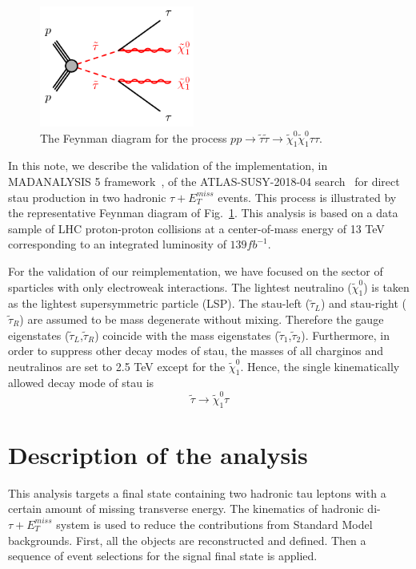 \documentclass{ws-mpla}
\begin{document}
\begin{figure}[t]
  \centerline{\includegraphics[width=2.0in]{fig_01}}
  \vspace*{8pt}
  \caption{The Feynman diagram for the process $pp\rightarrow\tilde{\tau}\tilde{\tau}\rightarrow\tilde{\chi}^0_1\tilde{\chi}^0_1\tau\tau$.\protect\label{fig:fig_01}}
\end{figure}

In this note, we describe the validation of the implementation, in MADANALYSIS 5 framework~\cite{Conte:2018vmg,Dumont:2014tja,Conte:2014zja,Conte:2012fm}, of the ATLAS-SUSY-2018-04 search~\cite{Aad:2019byo} for direct stau production in two hadronic $\tau +E^{miss}_T$ events. 
This process is illustrated by the representative Feynman diagram of Fig.~\ref{fig:fig_01}. 
This analysis is based on a data sample of LHC proton-proton collisions at a center-of-mass energy of 13 TeV corresponding to an integrated luminosity of $139 fb^{-1}$.

For the validation of our reimplementation, we have focused on the sector of sparticles with only electroweak interactions. 
The lightest neutralino ($\tilde{\chi}^0_1$) is taken as the lightest supersymmetric particle (LSP). 
The stau-left ($\tilde{\tau}_L$) and stau-right ($\tilde{\tau}_R$) are assumed to be mass degenerate without mixing.  Therefore the gauge eigenstates ($\tilde{\tau}_L$,$\tilde{\tau}_R$) coincide with the mass eigenstates ($\tilde{\tau}_1$,$\tilde{\tau}_2$). 
Furthermore, in order to suppress other decay modes of stau, the masses of all charginos and neutralinos are set to 2.5 TeV except for the $\tilde{\chi}^0_1$. 
Hence, the single kinematically allowed decay mode of stau is 
\begin{equation}
\tilde{\tau}\rightarrow\tilde{\chi}^0_1 \tau 
\end{equation}
 

\section{Description of the analysis}

This analysis targets a final state containing two hadronic tau leptons with a certain amount of missing transverse energy. 
The kinematics of {\color{blue}hadronic} di-$\tau +E^{miss}_T$ system is used to reduce the contributions from Standard Model backgrounds. 
First, all the objects are reconstructed and defined. Then a sequence of event selections for the signal final state is applied.
\end{document}
